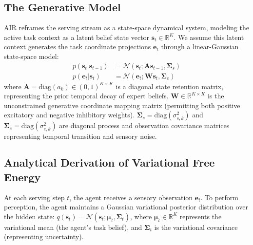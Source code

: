 \subsection{The Generative Model}
AIR reframes the serving stream as a state-space dynamical system, modeling the active task context as a latent belief state vector $\mathbf{s}_t \in \mathbb{R}^K$. We assume this latent context generates the task coordinate projections $\mathbf{e}_t$ through a linear-Gaussian state-space model:
\begin{align}
p(\mathbf{s}_t | \mathbf{s}_{t-1}) &= \mathcal{N}\left(\mathbf{s}_t; \mathbf{A}\mathbf{s}_{t-1}, \mathbf{\Sigma}_s\right) \label{eq:transition_prior} \\
p(\mathbf{e}_t | \mathbf{s}_t) &= \mathcal{N}\left(\mathbf{e}_t; \mathbf{W}\mathbf{s}_t, \mathbf{\Sigma}_e\right) \label{eq:likelihood}
\end{align}
where $\mathbf{A} = \text{diag}(a_k) \in (0, 1)^{K \times K}$ is a diagonal state retention matrix, representing the prior temporal decay of expert beliefs. $\mathbf{W} \in \mathbb{R}^{K \times K}$ is the unconstrained generative coordinate mapping matrix (permitting both positive excitatory and negative inhibitory weights). $\mathbf{\Sigma}_s = \text{diag}(\sigma_{s, k}^2)$ and $\mathbf{\Sigma}_e = \text{diag}(\sigma_{e, k}^2)$ are diagonal process and observation covariance matrices representing temporal transition and sensory noise.

\subsection{Analytical Derivation of Variational Free Energy}
At each serving step $t$, the agent receives a sensory observation $\mathbf{e}_t$. To perform perception, the agent maintains a Gaussian variational posterior distribution over the hidden state: $q(\mathbf{s}_t) = \mathcal{N}\left(\mathbf{s}_t; \mathbf{\mu}_t, \mathbf{\Sigma}_t\right)$, where $\mathbf{\mu}_t \in \mathbb{R}^K$ represents the variational mean (the agent's task belief), and $\mathbf{\Sigma}_t$ is the variational covariance (representing uncertainty).


